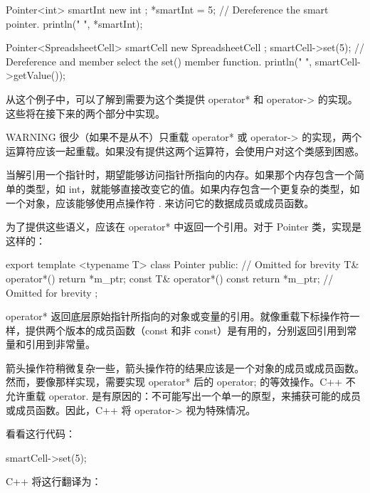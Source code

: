 \begin{cpp}
Pointer<int> smartInt { new int };
*smartInt = 5; // Dereference the smart pointer.
println("{} ", *smartInt);

Pointer<SpreadsheetCell> smartCell { new SpreadsheetCell };
smartCell->set(5); // Dereference and member select the set() member function.
println("{} ", smartCell->getValue());
\end{cpp}

从这个例子中，可以了解到需要为这个类提供 operator* 和 operator-> 的实现。这些将在接下来的两个部分中实现。

\begin{myWarning}{WARNING}
很少（如果不是从不）只重载 operator* 或 operator-> 的实现，两个运算符应该一起重载。如果没有提供这两个运算符，会使用户对这个类感到困惑。
\end{myWarning}


当解引用一个指针时，期望能够访问指针所指向的内存。如果那个内存包含一个简单的类型，如 int，就能够直接改变它的值。如果内存包含一个更复杂的类型，如一个对象，应该能够使用点操作符 . 来访问它的数据成员或成员函数。

为了提供这些语义，应该在 operator* 中返回一个引用。对于 Pointer 类，实现是这样的：

\begin{cpp}
export template <typename T> class Pointer
{
    public:
        // Omitted for brevity
        T& operator*() { return *m_ptr; }
        const T& operator*() const { return *m_ptr; }
        // Omitted for brevity
};
\end{cpp}

operator* 返回底层原始指针所指向的对象或变量的引用。就像重载下标操作符一样，提供两个版本的成员函数（const 和非 const）是有用的，分别返回引用到常量和引用到非常量。


箭头操作符稍微复杂一些，箭头操作符的结果应该是一个对象的成员或成员函数。然而，要像那样实现，需要实现 operator* 后的 operator; 的等效操作。C++ 不允许重载 operator. 是有原因的：不可能写出一个单一的原型，来捕获可能的成员或成员函数。因此，C++ 将 operator-> 视为特殊情况。

看看这行代码：

\begin{cpp}
smartCell->set(5);
\end{cpp}

C++ 将这行翻译为：

